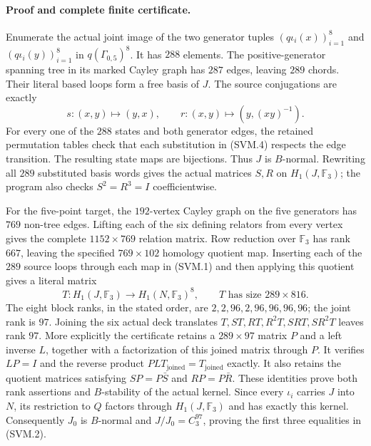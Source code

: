 \paragraph{Proof and complete finite certificate.}
Enumerate the actual joint image of the two generator tuples
$(q\iota_i(x))_{i=1}^8$ and $(q\iota_i(y))_{i=1}^8$ in $q(\Gamma_{0,5})^8$.
It has $288$ elements.  The positive-generator spanning tree in its
marked Cayley graph has $287$ edges, leaving $289$ chords.  Their
literal based loops form a free basis of $J$.  The source conjugations
are exactly
\[
 s:(x,y)\longmapsto(y,x),\qquad
 r:(x,y)\longmapsto(y,(xy)^{-1}).
                                                               \tag{SVM.4}
\]
For every one of the $288$ states and both generator edges, the retained
permutation tables check that each substitution in (SVM.4) respects
the edge transition.  The resulting state maps are bijections.  Thus
$J$ is $B$-normal.  Rewriting all $289$ substituted basis words gives
the actual matrices $S,R$ on $H_1(J,\mathbb F_3)$; the program also
checks $S^2=R^3=I$ coefficientwise.

For the five-point target, the $192$-vertex Cayley graph on the five
generators has $769$ non-tree edges.  Lifting each of the six defining
relators from every vertex gives the complete $1152\times769$
relation matrix.  Row reduction over $\mathbb F_3$ has rank $667$,
leaving the specified $769\times102$ homology quotient map.  Inserting
each of the $289$ source loops through each map in (SVM.1) and then
applying this quotient gives a literal matrix
\[
       T:H_1(J,\mathbb F_3)\longrightarrow
                     H_1(N,\mathbb F_3)^8,
       \qquad T\text{ has size }289\times816.
                                                               \tag{SVM.5}
\]
The eight block ranks, in the stated order, are
$2,2,96,2,96,96,96,96$; the joint rank is $97$.
Joining the six actual deck translates
$T,ST,RT,R^2T,SRT,SR^2T$ leaves rank $97$.
More explicitly the certificate retains a $289\times97$ matrix $P$
and a left inverse $L$, together with a factorization of this joined
matrix through $P$.  It verifies $LP=I$ and the reverse product
$PLT_{\mathrm{joined}}=T_{\mathrm{joined}}$ exactly.  It also retains
the quotient matrices satisfying $SP=P\bar S$ and $RP=P\bar R$.
These identities prove both rank assertions and $B$-stability of the
actual kernel.  Since every $\iota_i$ carries $J$ into $N$, its
restriction to $Q$ factors through $H_1(J,\mathbb F_3)$ and has
exactly this kernel.  Consequently $J_0$ is $B$-normal and
$J/J_0=C_3^{97}$, proving the first three equalities in (SVM.2).

